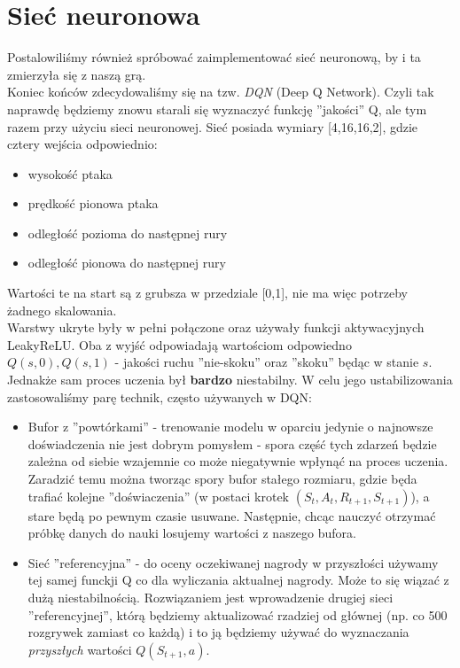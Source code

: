\documentclass[12pt, A4]{article}
\begin{document}
\section{Sieć neuronowa}
Postalowiliśmy również spróbować zaimplementować sieć neuronową, by i ta zmierzyła się z naszą grą. \\
	Koniec końców zdecydowaliśmy się na tzw. \textit{DQN} (Deep Q Network). Czyli tak naprawdę będziemy znowu starali się wyznaczyć funkcję ''jakości'' Q, ale tym razem przy użyciu sieci neuronowej.
	Sieć posiada wymiary [4,16,16,2], gdzie cztery wejścia odpowiednio:
	\begin{itemize}
	\item wysokość ptaka
	\item prędkość pionowa ptaka
	\item odległość pozioma do następnej rury
	\item odległość pionowa do następnej rury
	\end{itemize}
	Wartości te na start są z grubsza w przedziale [0,1], nie ma więc potrzeby żadnego skalowania. \\
	Warstwy ukryte były w pełni połączone oraz używały funkcji aktywacyjnych LeakyReLU. Oba z wyjść odpowiadają wartościom odpowiedno $Q(s, 0), Q(s, 1)$ - jakości ruchu ''nie-skoku'' oraz ''skoku'' będąc w stanie $s$. \\
	Jednakże sam proces uczenia był \textbf{bardzo} niestabilny. W celu jego ustabilizowania zastosowaliśmy parę technik, często używanych w DQN:
	\begin{itemize}
	\item Bufor z ''powtórkami'' - trenowanie modelu w oparciu jedynie o najnowsze doświadczenia nie jest dobrym pomysłem - spora część tych zdarzeń będzie zależna od siebie wzajemnie co może niegatywnie wpłynąć na proces uczenia. Zaradzić temu można tworząc spory bufor stałego rozmiaru, gdzie będa trafiać kolejne ''doświaczenia'' (w postaci krotek $(S_t, A_t, R_{t+1}, S_{t+1})$), a stare będą po pewnym czasie usuwane. Następnie, chcąc nauczyć otrzymać próbkę danych do nauki losujemy wartości z naszego bufora.
	\item Sieć ''referencyjna'' - do oceny oczekiwanej nagrody w przyszłości używamy tej samej funckji Q co dla wyliczania aktualnej nagrody. Może to się wiązać z dużą niestabilnością. Rozwiązaniem jest wprowadzenie drugiej sieci ''referencyjnej'', którą będziemy aktualizować rzadziej od głównej (np. co 500 rozgrywek zamiast co każdą) i to ją będziemy używać do wyznaczania \textit{przyszłych} wartości $Q(S_{t+1}, a)$.  
	\end{itemize}
\end{document}
